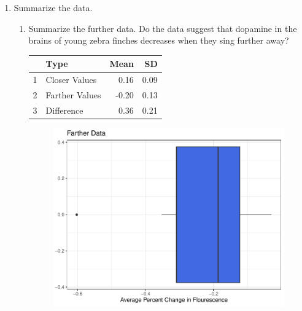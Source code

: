 \documentclass{article}\usepackage[]{graphicx}\usepackage[]{xcolor}
\makeatletter
\newenvironment{kframe}{%
 \def\at@end@of@kframe{}%
 \ifinner\ifhmode%
  \def\at@end@of@kframe{\end{minipage}}%
  \begin{minipage}{\columnwidth}%
 \fi\fi%
 \def\FrameCommand##1{\hskip\@totalleftmargin \hskip-\fboxsep
 \colorbox{shadecolor}{##1}\hskip-\fboxsep
     \hskip-\linewidth \hskip-\@totalleftmargin \hskip\columnwidth}%
 \MakeFramed {\advance\hsize-\width
   \@totalleftmargin\z@ \linewidth\hsize
   \@setminipage}}%
 {\par\unskip\endMakeFramed%
 \at@end@of@kframe}
\newenvironment{knitrout}{}{} %
\makeatother
\begin{document}
\begin{enumerate}
\begin{knitrout}
\begin{kframe}
{\ttfamily\noindent\itshape{}}\end{kframe}
\end{knitrout}
\item Summarize the data.
\begin{enumerate}
  \item Summarize the further data. Do the data suggest that
   dopamine in the brains of young zebra finches decreases when
   they sing further away?
   \begin{table}[ht]
\centering
\begin{tabular}{rlrr}
  \hline
 & Type & Mean & SD \\ 
  \hline
1 & Closer Values & 0.16 & 0.09 \\ 
  2 & Farther Values & -0.20 & 0.13 \\ 
  3 & Difference & 0.36 & 0.21 \\ 
   \hline
\end{tabular}
\end{table}
    \begin{figure}[H]
  \begin{center}
    \includegraphics[scale=0.35]{farther.pdf}

\end{center}
\end{figure}
\end{enumerate}
\end{enumerate}
\end{document}

